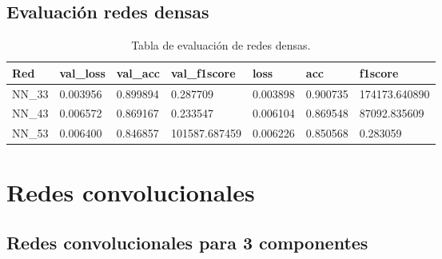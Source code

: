 \subsection{Evaluaci\'{o}n redes densas}

\begin{table}[H]
\centering
\begin{tabular}{|l|l|l|l|l|l|l|}
\hline
\textbf{Red} & \textbf{val\_loss} & \textbf{val\_acc} & \textbf{val\_f1score} & \textbf{loss} & \textbf{acc} & \textbf{f1score} \\ \hline
NN\_33 & 0.003956 & 0.899894 & 0.287709 & 0.003898 & 0.900735 & 174173.640890 \\ \hline
NN\_43 & 0.006572 & 0.869167 & 0.233547 & 0.006104 & 0.869548 & 87092.835609 \\ \hline
NN\_53 & 0.006400 & 0.846857 & 101587.687459 & 0.006226 & 0.850568 & 0.283059 \\ \hline
\end{tabular}
\caption{Tabla de evaluaci\'{o}n de redes densas.}
\label{table:evaluacion_nn}
\end{table}

\section{Redes convolucionales}


\subsection{Redes convolucionales para 3 componentes}

